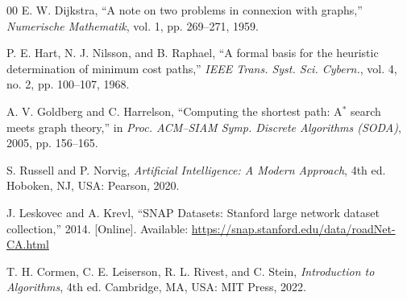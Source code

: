 \documentclass[conference,10pt]{IEEEtran}
\newcommand{\Astar}{A$^\ast$}
\begin{document}
\begin{thebibliography}{00}
E. W. Dijkstra, ``A note on two problems in connexion with graphs,''
\emph{Numerische Mathematik}, vol. 1, pp. 269--271, 1959.

P. E. Hart, N. J. Nilsson, and B. Raphael, ``A formal basis for the heuristic
determination of minimum cost paths,'' \emph{IEEE Trans. Syst. Sci. Cybern.},
vol. 4, no. 2, pp. 100--107, 1968.

A. V. Goldberg and C. Harrelson, ``Computing the shortest path: \Astar{} search
meets graph theory,'' in \emph{Proc. ACM--SIAM Symp. Discrete Algorithms
(SODA)}, 2005, pp. 156--165.

S. Russell and P. Norvig, \emph{Artificial Intelligence: A Modern Approach},
4th ed. Hoboken, NJ, USA: Pearson, 2020.

J. Leskovec and A. Krevl, ``SNAP Datasets: Stanford large network dataset
collection,'' 2014. [Online]. Available:
\url{https://snap.stanford.edu/data/roadNet-CA.html}

T. H. Cormen, C. E. Leiserson, R. L. Rivest, and C. Stein, \emph{Introduction
to Algorithms}, 4th ed. Cambridge, MA, USA: MIT Press, 2022.
\end{thebibliography}
\end{document}
